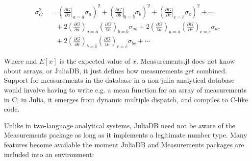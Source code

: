 \documentclass{juliacon}
\begin{document}
$$\begin{equation}
  \begin{align}
    \sigma_G^2 &= \left( \left.\frac{\partial G}{\partial a}\right\vert_{a =
        \bar{a}} \sigma_a \right)^2 + \left( \left.\frac{\partial G}{\partial
          b}\right\vert_{b = \bar{b}} \sigma_b \right)^2 + \left(
      \left.\frac{\partial G}{\partial c}\right\vert_{c = \bar{c}} \sigma_c
    \right)^2 + \cdots \\
    &\quad{}+ 2 \left(\frac{\partial G}{\partial a}\right)_{a = \bar{a}}
    \left(\frac{\partial G}{\partial b}\right)_{b = \bar{b}} \sigma_{ab} + 2
    \left(\frac{\partial G}{\partial a}\right)_{a = \bar{a}}
    \left(\frac{\partial G}{\partial c}\right)_{c = \bar{c}}
    \sigma_{ac} \\
    &\quad{}+ 2 \left(\frac{\partial G}{\partial b}\right)_{b = \bar{b}}
    \left(\frac{\partial G}{\partial c}\right)_{c = \bar{c}} \sigma_{bc} +
    \cdots
  \end{align}
\end{equation}$$


Where and $E[x]$ is the expected value of $x$.
Measurements.jl does not know about arrays, or JuliaDB, it just
defines how measurements get combined. Support for
measurements in the database in a non-julia analytical database
would involve having to write e.g. a mean function for an array
of measurements in C; in Julia, it emerges from dynamic
multiple dispatch, and compiles to C-like code.

Unlike in two-language analytical systems, JuliaDB need not be aware of the Measurements package as long as it implements a legitimate number type. Many features become available the moment JuliaDB and Measurements packages are included into an environment:
\end{document}
